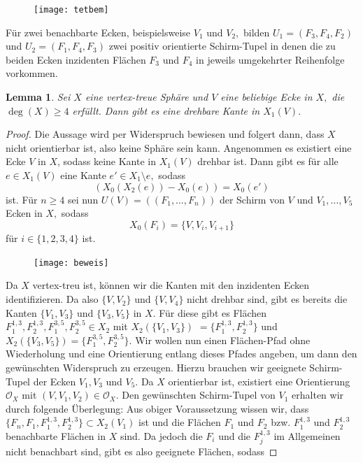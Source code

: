 \documentclass[12pt,titlepage,twoside,cleardoublepage]{article}
\theoremstyle{nummermitklammern}
\newtheorem{lemma}[temp]{Lemma}
\newtheorem{lemma}[zahl]{Lemma}
\numberwithin{equation}{section}
\begin{document}
\begin{figure}[H]
\begin{center}
\texttt{[image: tetbem]}
\end{center}
\end{figure} 
Für zwei benachbarte Ecken, beispielsweise $V_1$ und $V_2,$ bilden $U_1=(F_3,F_4,F_2)$ und $U_2=(F_1,F_4,F_3)$ zwei positiv orientierte Schirm-Tupel in denen die zu beiden Ecken inzidenten Flächen $F_3$ und $F_4$ in jeweils umgekehrter Reihenfolge vorkommen.
\begin{lemma}\label{grad3}
Sei $X$ eine vertex-treue Sphäre und $V$ eine beliebige Ecke in $X,$ die $\deg(X)\geq 4$ erfüllt. Dann gibt es eine drehbare Kante in $X_1(V).$ 
\end{lemma}
\begin{proof}
Die Aussage wird per Widerspruch bewiesen und folgert dann, dass $X$ nicht orientierbar ist, also keine Sphäre sein kann.
Angenommen es existiert eine Ecke $V$ in $X$, sodass keine Kante in $X_1(V)$ drehbar ist. Dann gibt es für alle $e\in X_1(V)$ eine Kante $e'\in X_1\setminus{e},$ sodass 
\[
(X_0(X_2(e))-X_0(e))=X_0(e')
\]
ist.
Für $n\geq 4$ sei nun $U(V)=((F_1,\ldots,F_n))$ der Schirm von $V$ und $V_1,\ldots,V_5$ Ecken in $X,$ sodass  
\[
X_0(F_i)=\{V,V_i,V_{i+1}\}
\] 
für $i\in\{1,2,3,4\}$ ist.
\begin{figure}[H]
\begin{center}
\texttt{[image: beweis]}
\end{center}
\end{figure} 
 Da $X$ vertex-treu ist, können wir die Kanten mit den inzidenten Ecken identifizieren. Da also $\{V,V_2\}$ und $\{V,V_4\}$ nicht drehbar sind, gibt es bereits die Kanten $\{V_1,V_3\}$ und $\{V_3,V_5\}$ in $X$. Für diese gibt es  Flächen $F^{1,3}_1,F^{1,3}_2,F^{3,5}_1,F^{3,5}_2\in X_2$ mit $X_2(\{V_1,V_3\})$ $=\{F^{1,3}_1,F^{1,3}_2\}$ und $X_2(\{V_3,V_5\})=\{F^{3,5}_1,F^{3,5}_2\}$. Wir wollen nun einen Flächen-Pfad ohne Wiederholung und eine Orientierung entlang dieses Pfades angeben, um dann den gewünschten Widerspruch zu erzeugen. Hierzu brauchen wir geeignete Schirm-Tupel der Ecken $V_1,V_3$ und $V_5.$ 
Da $X$ orientierbar ist, existiert eine Orientierung $\mathcal{O}_X$ mit $(V,V_1,V_2)\in \mathcal{O}_X.$
Den gewünschten Schirm-Tupel von $V_1$ erhalten wir durch folgende Überlegung: 
Aus obiger Voraussetzung wissen wir, dass $\{F_n,F_1,F_1^{1,3},F_2^{1,3}\}\subset X_2(V_1)$ ist und die Flächen $F_1$ und $F_2$ bzw. $F^{1,3}_1$ und $F^{1,3}_2$
benachbarte Flächen in $X$ sind. Da jedoch die $F_i$ und die $F_j^{1,3}$ im Allgemeinen nicht benachbart sind, gibt es also geeignete Flächen, sodass  

\end{proof}
\end{document}
